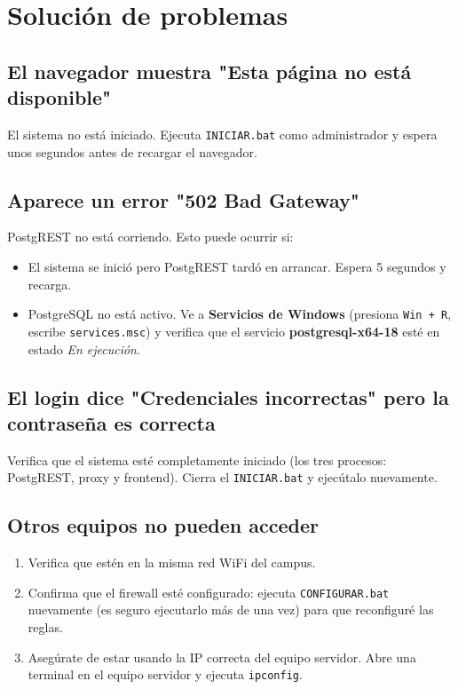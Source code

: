 \documentclass[12pt, a4paper]{article}
\begin{document}
\section{Solución de problemas}
\label{sec:problemas}

\subsection{El navegador muestra "Esta página no está disponible"}

El sistema no está iniciado. Ejecuta \texttt{INICIAR.bat} como
administrador y espera unos segundos antes de recargar el navegador.

\subsection{Aparece un error "502 Bad Gateway"}

PostgREST no está corriendo. Esto puede ocurrir si:
\begin{itemize}
  \item El sistema se inició pero PostgREST tardó en arrancar. Espera
        5 segundos y recarga.
  \item PostgreSQL no está activo. Ve a \textbf{Servicios de Windows}
        (presiona \texttt{Win + R}, escribe \texttt{services.msc}) y
        verifica que el servicio \textbf{postgresql-x64-18} esté en
        estado \emph{En ejecución}.
\end{itemize}

\subsection{El login dice "Credenciales incorrectas" pero la contraseña es correcta}

Verifica que el sistema esté completamente iniciado (los tres procesos:
PostgREST, proxy y frontend). Cierra el \texttt{INICIAR.bat} y
ejecútalo nuevamente.

\subsection{Otros equipos no pueden acceder}

\begin{enumerate}
  \item Verifica que estén en la misma red WiFi del campus.
  \item Confirma que el firewall esté configurado: ejecuta
        \texttt{CONFIGURAR.bat} nuevamente (es seguro ejecutarlo más de
        una vez) para que reconfiguré las reglas.
  \item Asegúrate de estar usando la IP correcta del equipo servidor.
        Abre una terminal en el equipo servidor y ejecuta \texttt{ipconfig}.
\end{enumerate}
\end{document}
